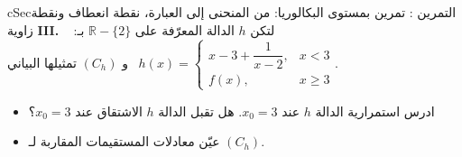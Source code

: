 \documentclass[12pt,a4paper]{article}
\newenvironment{BOX}[2]{\begin{otherlanguage}{english}\begin{arbox}{#1}{#2}}{\end{arbox}\end{otherlanguage}}
\newcounter{exo}
\newenvironment{tamrin}[1]{\stepcounter{exo}\begin{BOX}{cSec}{التمرين \theexo: #1}}{\end{BOX}}
\newcommand{\R}{\mathbb{R}}
\begin{document}
\begin{tamrin}{تمرين بمستوى البكالوريا: من المنحنى إلى العبارة، نقطة انعطاف ونقطة زاوية}
\textbf{III.} لتكن $h$ الدالة المعرّفة على $\R-\{2\}$ بـ: \ $h(x)=\left\{\begin{array}{ll}x-3+\dfrac{1}{x-2}, & x<3\\[3mm] f(x), & x\geqslant3\end{array}\right.$ \ و $(C_h)$ تمثيلها البياني.
\begin{itemize}[label=\textcircled{\scriptsize S}]
\item ادرس استمرارية الدالة $h$ عند $x_0=3$. هل تقبل الدالة $h$ الاشتقاق عند $x_0=3$؟
\item عيّن معادلات المستقيمات المقاربة لـ $(C_h)$.
\end{itemize}
\end{tamrin}
\end{document}
